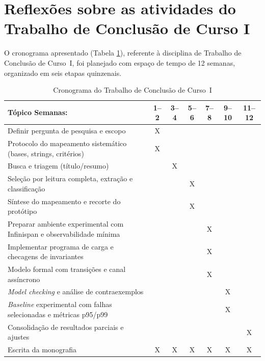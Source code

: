\section{Reflexões sobre as atividades do Trabalho de Conclusão de Curso I}
\label{sec-cronograma}

O cronograma apresentado (Tabela \ref{tab-cronograma-tcc1}), referente à disciplina de Trabalho de Conclusão de Curso~I, foi planejado com espaço de tempo de 12 semanas, organizado em seis etapas quinzenais.

\begin{table}[!h]
\captionsetup{type=table, name=Tabela}
\caption{Cronograma do Trabalho de Conclusão de Curso~I}
\centering
\small
\begin{tabular}{p{8cm}cccccc}
\hline
\textbf{Tópico} \hspace{5cm}\textbf{Semanas:} & \textbf{1--2} & \textbf{3--4} & \textbf{5--6} & \textbf{7--8} & \textbf{9--10} & \textbf{11--12} \\
\hline
Definir pergunta de pesquisa e escopo & X &  &  &  &  &  \\
Protocolo do mapeamento sistemático (bases, strings, critérios) & X &  &  &  &  &  \\
Busca e triagem (título/resumo) &  & X &  &  &  &  \\
Seleção por leitura completa, extração e classificação &  &  & X &  &  &  \\
Síntese do mapeamento e recorte do protótipo &  &  & X &  &  &  \\
Preparar ambiente experimental com Infinispan e observabilidade mínima &  &  &  & X &  &  \\
Implementar programa de carga e checagens de invariantes &  &  &  & X &  &  \\
Modelo formal com transições e canal assíncrono &  &  &  & X &  &  \\
\emph{Model checking} e análise de contraexemplos &  &  &  &  & X &  \\
\emph{Baseline} experimental com falhas selecionadas e métricas p95/p99 &  &  &  &  & X &  \\
Consolidação de resultados parciais e ajustes &  &  &  &  &  & X \\
Escrita da monografia & X & X & X & X & X & X \\
\hline
\end{tabular}
\label{tab-cronograma-tcc1}
\end{table}

